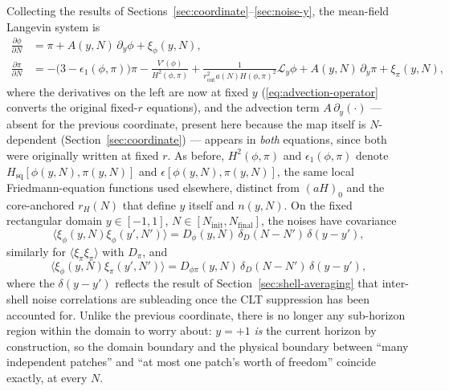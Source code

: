 \documentclass[a4paper,11pt]{article}
\newcommand{\Ny}{N}                          %
\newcommand{\Ninit}{N_{\mathrm{init}}}       %
\newcommand{\Nfinal}{N_{\mathrm{final}}}     %
\newcommand{\epsSR}{\epsilon_1}              %
\newcommand{\Hub}{H}                         %
\newcommand{\sfactor}{a}                     %
\newcommand{\atloc}{(\field,\mom)}           %
\newcommand{\field}{\phi}                    %
\newcommand{\mom}{\pi}                       %
\newcommand{\Vpot}{V}                        %
\newcommand{\noise}[1]{\xi_{#1}}             %
\newcommand{\rad}{r}                         %
\newcommand{\yco}{y}                         %
\newcommand{\rout}{\rad_{\mathrm{out}}}      %
\newcommand{\aHo}{(\sfactor \Hub)_0}         %
\newcommand{\aHloc}{\sfactor(\Ny)\Hub\atloc} %
\newcommand{\rH}{\rad_H}                     %
\newcommand{\advcoef}{A}                     %
\newcommand{\Lop}{\mathcal{L}_\yco}          %
\newcommand{\Dnoise}[1]{D_{#1}}              %
\newcommand{\ncount}{n}                      %
\begin{document}
Collecting the results of Sections~\ref{sec:coordinate}--\ref{sec:noise-y},
the mean-field Langevin system is
\begin{subequations}
\label{eq:langevin-y}
\begin{align}
    \frac{\partial \field}{\partial \Ny}
    & =
    \mom + \advcoef(\yco,\Ny)\,\partial_\yco\field + \noise{\field}(\yco,\Ny) ,
    \\
    \frac{\partial \mom}{\partial \Ny}
    & =
    -\big(3-\epsSR\atloc\big)\mom - \frac{\Vpot'(\field)}{\Hub^2\atloc}
    + \frac{1}{\rout^2\aHloc^2} \Lop \field
    + \advcoef(\yco,\Ny)\,\partial_\yco\mom
    + \noise{\mom}(\yco,\Ny) ,
\end{align}
\end{subequations}
where the derivatives on the left are now at fixed $\yco$
(\eqref{eq:advection-operator} converts the original fixed-$\rad$ equations),
and the advection term $\advcoef\,\partial_\yco(\cdot)$ --- absent for the
previous coordinate, present here because the map itself is
$\Ny$-dependent (Section~\ref{sec:coordinate}) --- appears in \emph{both}
equations, since both were originally written at fixed $\rad$. As before,
$\Hub^2\atloc$ and $\epsSR\atloc$ denote $H_{\mathrm{sq}}[\field(\yco,\Ny),\mom(\yco,\Ny)]$
and $\epsilon[\field(\yco,\Ny),\mom(\yco,\Ny)]$, the same local
Friedmann-equation functions used elsewhere, distinct from $\aHo$ and the
core-anchored $\rH(\Ny)$ that define $\yco$ itself and $\ncount(\yco,\Ny)$. On the fixed rectangular domain $\yco\in[-1,1]$,
$\Ny\in[\Ninit,\Nfinal]$, the noises have covariance
\begin{equation}
    \big\langle \noise{\field}(\yco,\Ny)\noise{\field}(\yco',\Ny')\big\rangle
    =
    \Dnoise{\field}(\yco,\Ny)\,\delta_D(\Ny-\Ny')\,\delta(\yco-\yco') ,
\end{equation}
similarly for $\big\langle\noise{\mom}\noise{\mom}\big\rangle$ with
$\Dnoise{\mom}$, and
\begin{equation}
    \big\langle \noise{\field}(\yco,\Ny)\noise{\mom}(\yco',\Ny')\big\rangle
    =
    \Dnoise{\field\mom}(\yco,\Ny)\,\delta_D(\Ny-\Ny')\,\delta(\yco-\yco') ,
    \label{eq:noise-corr}
\end{equation}
where the $\delta(\yco-\yco')$ reflects the result of
Section~\ref{sec:shell-averaging} that inter-shell noise correlations are
subleading once the CLT suppression has been accounted for. Unlike the
previous coordinate, there is no longer any sub-horizon region within the
domain to worry about: $\yco=+1$ \emph{is} the current horizon by
construction, so the domain boundary and the physical boundary between
``many independent patches'' and ``at most one patch's worth of freedom''
coincide exactly, at every $\Ny$.
\end{document}

